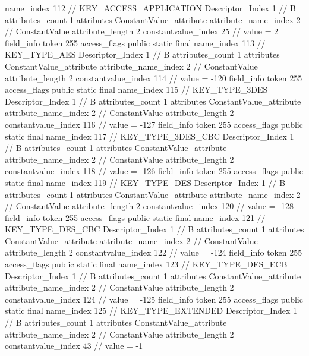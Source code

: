 {{{{{				name_index	112		// KEY_ACCESS_APPLICATION
				Descriptor_Index	1		// B
				attributes_count	1
				attributes {
				ConstantValue_attribute {
					attribute_name_index	2		// ConstantValue
					attribute_length	2
					constantvalue_index	25		// value = 2
				}
				}
			}
			field_info {
				token	255
				access_flags	public static final
				name_index	113		// KEY_TYPE_AES
				Descriptor_Index	1		// B
				attributes_count	1
				attributes {
				ConstantValue_attribute {
					attribute_name_index	2		// ConstantValue
					attribute_length	2
					constantvalue_index	114		// value = -120
				}
				}
			}
			field_info {
				token	255
				access_flags	public static final
				name_index	115		// KEY_TYPE_3DES
				Descriptor_Index	1		// B
				attributes_count	1
				attributes {
				ConstantValue_attribute {
					attribute_name_index	2		// ConstantValue
					attribute_length	2
					constantvalue_index	116		// value = -127
				}
				}
			}
			field_info {
				token	255
				access_flags	public static final
				name_index	117		// KEY_TYPE_3DES_CBC
				Descriptor_Index	1		// B
				attributes_count	1
				attributes {
				ConstantValue_attribute {
					attribute_name_index	2		// ConstantValue
					attribute_length	2
					constantvalue_index	118		// value = -126
				}
				}
			}
			field_info {
				token	255
				access_flags	public static final
				name_index	119		// KEY_TYPE_DES
				Descriptor_Index	1		// B
				attributes_count	1
				attributes {
				ConstantValue_attribute {
					attribute_name_index	2		// ConstantValue
					attribute_length	2
					constantvalue_index	120		// value = -128
				}
				}
			}
			field_info {
				token	255
				access_flags	public static final
				name_index	121		// KEY_TYPE_DES_CBC
				Descriptor_Index	1		// B
				attributes_count	1
				attributes {
				ConstantValue_attribute {
					attribute_name_index	2		// ConstantValue
					attribute_length	2
					constantvalue_index	122		// value = -124
				}
				}
			}
			field_info {
				token	255
				access_flags	public static final
				name_index	123		// KEY_TYPE_DES_ECB
				Descriptor_Index	1		// B
				attributes_count	1
				attributes {
				ConstantValue_attribute {
					attribute_name_index	2		// ConstantValue
					attribute_length	2
					constantvalue_index	124		// value = -125
				}
				}
			}
			field_info {
				token	255
				access_flags	public static final
				name_index	125		// KEY_TYPE_EXTENDED
				Descriptor_Index	1		// B
				attributes_count	1
				attributes {
				ConstantValue_attribute {
					attribute_name_index	2		// ConstantValue
					attribute_length	2
					constantvalue_index	43		// value = -1
}}}}}}}

